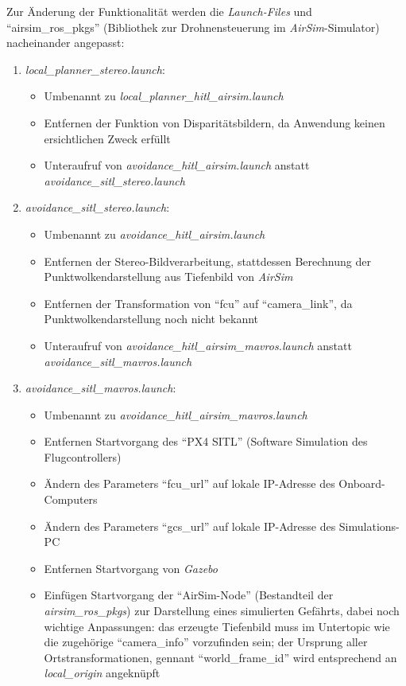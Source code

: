 Zur Änderung der Funktionalität werden die \textit{Launch-Files} und \enquote{airsim\_ros\_pkgs} (Bibliothek zur Drohnensteuerung im \textit{AirSim}-Simulator) nacheinander angepasst:
\begin{enumerate}
    \item \textit{local\_planner\_stereo.launch}:
    \begin{itemize}
        \item Umbenannt zu \textit{local\_planner\_hitl\_airsim.launch}
        \item Entfernen der Funktion von Disparitätsbildern, da Anwendung keinen ersichtlichen Zweck erfüllt
        \item Unteraufruf von \textit{avoidance\_hitl\_airsim.launch} anstatt \textit{avoidance\_sitl\_stereo.launch}
    \end{itemize}
    \item \textit{avoidance\_sitl\_stereo.launch}:
    \begin{itemize}
        \item Umbenannt zu \textit{avoidance\_hitl\_airsim.launch}
        \item Entfernen der Stereo-Bildverarbeitung, stattdessen Berechnung der Punktwolkendarstellung aus Tiefenbild von \textit{AirSim}
        \item Entfernen der Transformation von \enquote{fcu} auf \enquote{camera\_link}, da Punktwolkendarstellung noch nicht bekannt
        \item Unteraufruf von \textit{avoidance\_hitl\_airsim\_mavros.launch} anstatt \textit{avoidance\_sitl\_mavros.launch}
    \end{itemize}
    \item \textit{avoidance\_sitl\_mavros.launch}:
    \begin{itemize}
        \item Umbenannt zu \textit{avoidance\_hitl\_airsim\_mavros.launch}
        \item Entfernen Startvorgang des \enquote{PX4 SITL} (Software Simulation des Flugcontrollers)
        \item Ändern des Parameters \enquote{fcu\_url} auf lokale IP-Adresse des Onboard-Computers
        \item Ändern des Parameters \enquote{gcs\_url} auf lokale IP-Adresse des Simulations-PC
        \item Entfernen Startvorgang von \textit{Gazebo}
        \item Einfügen Startvorgang der \enquote{AirSim-Node} (Bestandteil der \textit{airsim\_ros\_pkgs}) zur Darstellung eines simulierten Gefährts, dabei noch wichtige Anpassungen: das erzeugte Tiefenbild muss im Untertopic wie die zugehörige \enquote{camera\_info} vorzufinden sein; der Ursprung aller Ortstransformationen, gennant \enquote{world\_frame\_id} wird entsprechend an \textit{local\_origin} angeknüpft

\end{itemize}
\end{enumerate}
